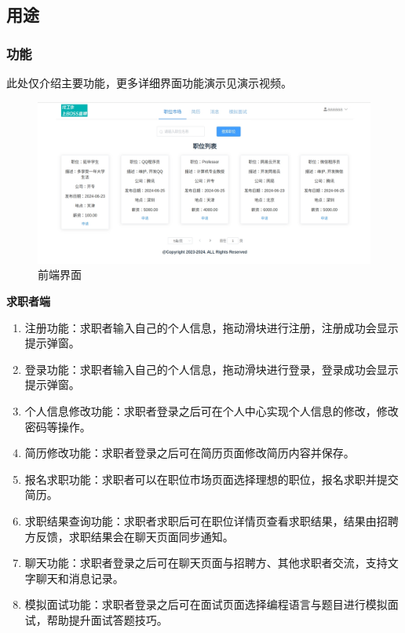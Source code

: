 \documentclass[UTF8,a4paper,10pt]{ctexart}
\begin{document}
\subsection{用途}

\subsubsection{功能}

此处仅介绍主要功能，更多详细界面功能演示见演示视频。

\begin{figure}[H]
    \centering
    \includegraphics[width=\textwidth]{img/前端界面.png}
    \caption{前端界面}
    \label{fig:前端界面}
\end{figure}

\textbf{求职者端}
\begin{enumerate}
    \item 注册功能：求职者输入自己的个人信息，拖动滑块进行注册，注册成功会显示提示弹窗。
    \item 登录功能：求职者输入自己的个人信息，拖动滑块进行登录，登录成功会显示提示弹窗。
    \item 个人信息修改功能：求职者登录之后可在个人中心实现个人信息的修改，修改密码等操作。
    \item 简历修改功能：求职者登录之后可在简历页面修改简历内容并保存。
    \item 报名求职功能：求职者可以在职位市场页面选择理想的职位，报名求职并提交简历。
    \item 求职结果查询功能：求职者求职后可在职位详情页查看求职结果，结果由招聘方反馈，求职结果会在聊天页面同步通知。
    \item 聊天功能：求职者登录之后可在聊天页面与招聘方、其他求职者交流，支持文字聊天和消息记录。
    \item 模拟面试功能：求职者登录之后可在面试页面选择编程语言与题目进行模拟面试，帮助提升面试答题技巧。
\end{enumerate}
\end{document}
